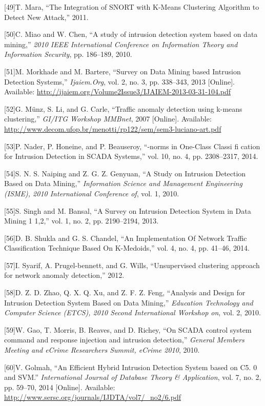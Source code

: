 \documentclass[12pt,]{article}
\begin{document}
{[}49{]}T. Mara, ``The Integration of SNORT with K-Means Clustering
Algorithm to Detect New Attack,'' 2011.

{[}50{]}C. Miao and W. Chen, ``A study of intrusion detection system
based on data mining,'' \emph{2010 IEEE International Conference on
Information Theory and Information Security}, pp. 186--189, 2010.

{[}51{]}M. Morkhade and M. Bartere, ``Survey on Data Mining based
Intrusion Detection Systems,'' \emph{Ijaiem.Org}, vol. 2, no. 3, pp.
338--343, 2013 {[}Online{]}. Available:
\url{http://ijaiem.org/Volume2Issue3/IJAIEM-2013-03-31-104.pdf}

{[}52{]}G. Münz, S. Li, and G. Carle, ``Traffic anomaly detection using
k-means clustering,'' \emph{GI/ITG Workshop MMBnet}, 2007 {[}Online{]}.
Available:
\url{http://www.decom.ufop.br/menotti/rp122/sem/sem3-luciano-art.pdf}

{[}53{]}P. Nader, P. Honeine, and P. Beauseroy, ``-norms in One-Class
Classi fi cation for Intrusion Detection in SCADA Systems,'' vol. 10,
no. 4, pp. 2308--2317, 2014.

{[}54{]}S. N. S. Naiping and Z. G. Z. Genyuan, ``A Study on Intrusion
Detection Based on Data Mining,'' \emph{Information Science and
Management Engineering (ISME), 2010 International Conference of}, vol.
1, 2010.

{[}55{]}S. Singh and M. Bansal, ``A Survey on Intrusion Detection System
in Data Mining 1 1,2,'' vol. 1, no. 2, pp. 2190--2194, 2013.

{[}56{]}D. B. Shukla and G. S. Chandel, ``An Implementation Of Network
Traffic Classification Technique Based On K-Medoids,'' vol. 4, no. 4,
pp. 41--46, 2014.

{[}57{]}I. Syarif, A. Prugel-bennett, and G. Wills, ``Unsupervised
clustering approach for network anomaly detection,'' 2012.

{[}58{]}D. Z. D. Zhao, Q. X. Q. Xu, and Z. F. Z. Feng, ``Analysis and
Design for Intrusion Detection System Based on Data Mining,''
\emph{Education Technology and Computer Science (ETCS), 2010 Second
International Workshop on}, vol. 2, 2010.

{[}59{]}W. Gao, T. Morris, B. Reaves, and D. Richey, ``On SCADA control
system command and response injection and intrusion detection,''
\emph{General Members Meeting and eCrime Researchers Summit, eCrime
2010}, 2010.

{[}60{]}V. Golmah, ``An Efficient Hybrid Intrusion Detection System
based on C5. 0 and SVM.'' \emph{International Journal of Database Theory
\& Application}, vol. 7, no. 2, pp. 59--70, 2014 {[}Online{]}.
Available: \url{http://www.sersc.org/journals/IJDTA/vol7/_no2/6.pdf}
\end{document}

